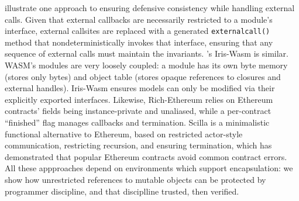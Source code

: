 \citet{CassezFQ24} illustrate one approach to ensuring defensive
consistency while handling external calls.
Given that 
external callbacks
are
necessarily restricted to a module's interface,
external callsites are replaced 
with a
generated \texttt{externalcall()} method that 
nondeterministically invokes
%
that 
interface, 
ensuring that any 
sequence of external calls must maintain the
invariants.
%
%
\citet{iris-wasm-pldi2023}'s Iris-Wasm is similar.
WASM's
modules are very loosely coupled: a module
has its own byte memory
(stores only bytes) 
and object table
(stores opaque references to closures and external handles).
%
%
Iris-Wasm ensures models 
can only be
modified via their explicitly exported interfaces.
%
Likewise, Rich-Ethereum \cite{rich-specs-smart-contracts-oopsla2021}
relies on Ethereum%
contracts' fields being instance-private
and unaliased, while
a per-contract ``finished'' flag
manages callbacks and termination.
%
%
%
%
%
Scilla \cite{sergey-scilla-oopsla2019}
is a minimalistic functional alternative to Ethereum,
based on restricted actor-style
communication, restricting recursion, and ensuring termination,
which has demonstrated that popular Ethereum
contracts avoid common contract errors.
%
All these appproaches depend on
environments which support encapsulation:
we show how unrestricted references to mutable objects can be protected
by programmer discipline,
and that disciplline trusted, then verified.

